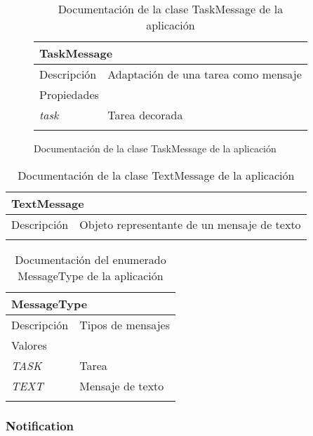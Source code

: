 \begin{figure}[H]
\begin{longtable}{|p{} p{}|}
    \hline
    \multicolumn{2}{|l|}{\textbf{TaskMessage}} \\ \hline \hline
    Descripción      & Adaptación de una tarea como mensaje \\ \hline
    \multicolumn{2}{|l|}{Propiedades} \\
    \emph{task}  & Tarea decorada \\  \hline
    \caption{Documentación de la clase TaskMessage de la aplicación}
    \label{dis:app:task_message}
\end{longtable}
\end{figure}

\begin{longtable}{|p{} p{}|}
    \hline
    \multicolumn{2}{|l|}{\textbf{TextMessage}} \\ \hline \hline
    Descripción      & Objeto representante de un mensaje de texto \\ \hline
    \caption{Documentación de la clase TextMessage de la aplicación}
    \label{dis:app:text_message}
\end{longtable}

\begin{longtable}{|p{} p{}|}
    \hline
    \multicolumn{2}{|l|}{\textbf{MessageType}} \\ \hline \hline
    Descripción      & Tipos de mensajes \\ \hline
    \multicolumn{2}{|l|}{Valores} \\
    \emph{TASK}  & Tarea  \\
    \emph{TEXT}  & Mensaje de texto  \\ \hline
    \caption{Documentación del enumerado MessageType de la aplicación}
    \label{dis:app:message_type}
\end{longtable}

\subsubsection{Notification}

